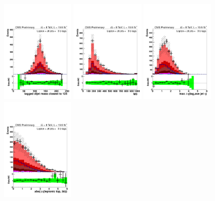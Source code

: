 \begin{figure}[hbtp]
\begin{center}
   \includegraphics[width=0.31\textwidth]{Figures/Analysis_2_Diagrams/LJ_plots_lep/6j3t/lep_tagged_dijet_mass_closest_to_125_6j3t_cumulative_wRatio_noLegend_lin.pdf}
   \includegraphics[width=0.31\textwidth]{Figures/Analysis_2_Diagrams/LJ_plots_lep/6j3t/lep_M3_6j3t_cumulative_wRatio_noLegend_lin.pdf}
   \includegraphics[width=0.31\textwidth]{Figures/Analysis_2_Diagrams/LJ_plots_lep/6j3t/lep_maxeta_jet_tag_6j3t_cumulative_wRatio_noLegend_lin.pdf}
   \includegraphics[width=0.31\textwidth]{Figures/Analysis_2_Diagrams/LJ_plots_lep/6j3t/lep_abs_dEta_leptop_bb_6j3t_cumulative_wRatio_noLegend_lin.pdf}

\end{center}
\end{figure}
